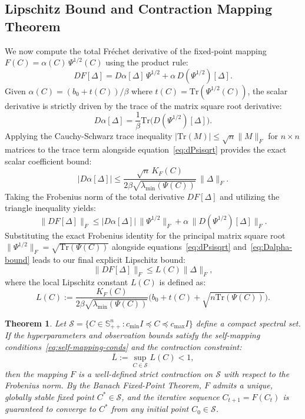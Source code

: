 \documentclass[11pt]{article}
\newtheorem{theorem}{Theorem}
\begin{document}
\subsection{Lipschitz Bound and Contraction Mapping Theorem}
We now compute the total Fr\'echet derivative of the fixed-point mapping $F(C) = \alpha(C)\,\Psi^{1/2}(C)$ using the product rule:
\begin{equation}
DF[\Delta] = D\alpha[\Delta]\,\Psi^{1/2} + \alpha\,D(\Psi^{1/2})[\Delta].
\end{equation}
Given $\alpha(C) = (b_0+t(C))/\beta$ where $t(C) = \text{Tr}(\Psi^{1/2}(C))$, the scalar derivative is strictly driven by the trace of the matrix square root derivative:
\begin{equation}
D\alpha[\Delta] = \frac{1}{\beta}\text{Tr}\big(D(\Psi^{1/2})[\Delta]\big).
\end{equation}
Applying the Cauchy-Schwarz trace inequality $|\text{Tr}(M)| \le \sqrt{n}\|M\|_F$ for $n \times n$ matrices to the trace term alongside equation~\eqref{eq:dPsisqrt} provides the exact scalar coefficient bound:
\begin{equation}\label{eq:Dalpha-bound}
|D\alpha[\Delta]| \le \frac{\sqrt{n}\,K_F(C)}{2\beta\sqrt{\lambda_{\min}(\Psi(C))}}\,\|\Delta\|_F.
\end{equation}
Taking the Frobenius norm of the total derivative $DF[\Delta]$ and utilizing the triangle inequality yields:
\begin{equation}
\|DF[\Delta]\|_F \le |D\alpha[\Delta]|\,\|\Psi^{1/2}\|_F + \alpha\,\|D(\Psi^{1/2})[\Delta]\|_F.
\end{equation}
Substituting the exact Frobenius identity for the principal matrix square root $\|\Psi^{1/2}\|_F = \sqrt{\text{Tr}(\Psi(C))}$ alongside equations~\eqref{eq:dPsisqrt} and~\eqref{eq:Dalpha-bound} leads to our final explicit Lipschitz bound:
\begin{equation}\label{eq:L-bound}
\|DF[\Delta]\|_F \le L(C)\|\Delta\|_F,
\end{equation}
where the local Lipschitz constant $L(C)$ is defined as:
\begin{equation}
L(C) := \frac{K_F(C)}{2\beta\sqrt{\lambda_{\min}(\Psi(C))}}\Big( b_0 + t(C) + \sqrt{n \text{Tr}(\Psi(C))} \Big).
\end{equation}

\begin{theorem}
Let $\mathcal{S} = \{C \in \mathbb{S}_{++}^n : c_{\min}I \preceq C \preceq c_{\max}I\}$ define a compact spectral set. If the hyperparameters and observation bounds satisfy the self-mapping conditions~\eqref{eq:self-mapping-conds} and the contraction constraint:
\begin{equation}
\bar{L} := \sup_{C \in \mathcal{S}} L(C) < 1,
\end{equation}
then the mapping $F$ is a well-defined strict contraction on $\mathcal{S}$ with respect to the Frobenius norm. By the Banach Fixed-Point Theorem, $F$ admits a unique, globally stable fixed point $C^* \in \mathcal{S}$, and the iterative sequence $C_{t+1} = F(C_t)$ is guaranteed to converge to $C^*$ from any initial point $C_0 \in \mathcal{S}$.
\end{theorem}
\end{document}
